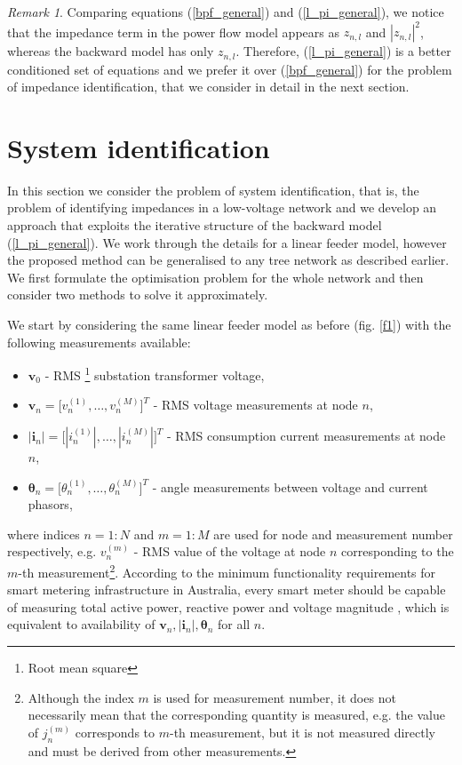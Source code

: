 \documentclass[journal,10pt,onecolumn,draftclsnofoot,]{IEEEtran}
\theoremstyle{plain}
\theoremstyle{definition}
\theoremstyle{remark}
\newtheorem*{remark}{Remark}
\begin{document}
\begin{remark}
  Comparing equations (\ref{bpf_general}) and (\ref{l_pi_general}), we notice that the impedance term in the power flow model appears as $z_{n, l}$ and $|z_{n, l}|^2$, whereas the backward model has only $z_{n, l}$. Therefore, (\ref{l_pi_general}) is a better conditioned set of equations and we prefer it over (\ref{bpf_general}) for the problem of impedance identification, that we consider in detail in the next section.
\end{remark}

\section{System identification}
\label{system_identification_section}
In this section we consider the problem of system identification, that is, the problem of identifying impedances in a low-voltage network and we develop an approach that exploits the iterative structure of the backward model (\ref{l_pi_general}). We work through the details for a linear feeder model, however the proposed method can be generalised to any tree network as described earlier. We first formulate the optimisation problem for the whole network and then consider two methods to solve it approximately.

We start by considering the same linear feeder model as before (fig. \ref{f1}) with the following measurements available:
\begin{itemize}
  \item $\bm{v}_0$ - RMS \footnote{Root mean square} substation transformer voltage,
  \item $\bm{v}_{n} = \big[ v_{n}^{(1)}, \ldots, v_{n}^{(M)} \big]^T$ - RMS voltage measurements at node $n$,
  \item $|\bm{i}_{n}| = \big[ |i_{n}^{(1)}|, \ldots, |i_{n}^{(M)}| \big]^T$ - RMS consumption current measurements at node $n$, 
  \item $\bm{\theta}_{n} = \big[\theta_{n}^{(1)}, \ldots, \theta_{n}^{(M)}]^T$ - angle measurements between voltage and current phasors,
\end{itemize}
where indices $n = 1:N$ and $m = 1:M$ are used for node and measurement number respectively, e.g. $v_{n}^{(m)}$ - RMS value of the voltage at node $n$ corresponding to the $m$-th measurement\footnote{Although the index $m$ is used for measurement number, it does not necessarily mean that the corresponding quantity is measured, e.g. the value of $j_{n}^{(m)}$ corresponds to $m$-th measurement, but it is not measured directly and must be derived from other measurements.}. According to the minimum functionality requirements for smart metering infrastructure in Australia, every smart meter should be capable of measuring total active power, reactive power and voltage magnitude \cite[Table $6-2$]{SMmin_au}, which is equivalent to availability of $\bm{v}_{n}, |\bm{i}_{n}|, \bm{\theta}_n$ for all $n$. 
\end{document}

